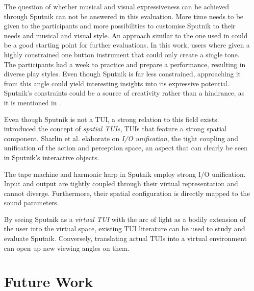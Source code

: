 \documentclass[10pt,a4paper]{scrartcl}
\begin{document}
	
The question of whether musical and visual expressiveness can be achieved through Sputnik can not be answered in this evaluation. More time needs to be given to the participants and more possibilities to customise Sputnik to their needs and musical and visual style. An approach similar to the one used in \citep{Gurevich2010} could be a good starting point for further evaluations. In this work, users where given a highly constrained one button instrument that could only create a single tone. The participants had a week to practice and prepare a performance, resulting in  diverse play styles. Even though Sputnik is far less constrained, approaching it from this angle could yield interesting insights into its expressive potential. Sputnik's constraints could be a source of creativity rather than a hindrance, as it is mentioned in \citep{Magnusson2010}. 


Even though Sputnik is not a TUI, a strong relation to this field exists. \cite{Sharlin2004} introduced the concept of \emph{spatial TUIs}, TUIs that feature a strong spatial component. Sharlin et al. elaborate on \emph{I/O unification}, the tight coupling and unification of the action and perception space, an aspect that can clearly be seen in Sputnik's interactive objects.

The tape machine and harmonic harp in Sputnik employ strong I/O unification. Input and output are tightly coupled through their virtual representation and cannot diverge. Furthermore, their spatial configuration is directly mapped to the sound parameters. 

By seeing Sputnik as a \emph{virtual TUI} with the arc of light as a bodily extension of the user into the virtual space, existing TUI literature can be used to study and evaluate Sputnik. Conversely, translating actual TUIs into a virtual environment can open up new viewing angles on them.


\section{Future Work}
\end{document}
